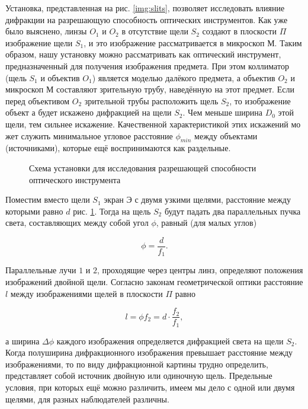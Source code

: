 Установка, представленная на рис. \ref{img:slits}, позволяет исследовать влияние
дифракции на разрешающую способность оптических инструментов.
Как уже было выяснено, линзы
$O_1$ и
$O_2$ в отсутствие щели
$S_2$ создают
в плоскости
$\Pi$ изображение щели
$S_1$, и это изображение рассматривается
в микроскоп $М$.
Таким образом, нашу
установку можно рассматривать
как оптический инструмент, предназначенный для получения изображения предмета. При этом
коллиматор (щель
$S_1$ и объектив
$O_1$) является
моделью далёкого предмета,
а объектив
$O_2$ и микроскоп
$М$ составляют
зрительную трубу, наведённую на этот предмет.
Если перед объективом
$O_2$ зрительной трубы расположить щель
$S_2$,
то изображение объект
а будет искажено дифракцией на щели
$S_2$. Чем
меньше ширина
$D_0$ этой щели, тем сильнее искажение. Качественной
характеристикой этих искажений мо
жет служить минимальное угловое
расстояние $\phi_{min}$ между объектами (источниками),
которые ещё воспринимаются
как раздельные.

\begin{figure}[h]
  \caption{Схема установки для исследования разрешающей способности оптического инструмента}
  \label{img:fraunres}
\end{figure}

Поместим вместо щели
$S_1$ экран
$Э$ с двумя узкими щелями, расстояние между
которыми равно
$d$ рис. \ref{img:fraunres}.
Тогда на щель
$S_2$ будут падать два параллельных пучка света, составляющих между собой угол
$\phi$, равный (для малых углов)

\begin{equation}
  \phi = \frac{d}{f_1}.
\end{equation}\label{eq:ray_angle}

Параллельные лучи $1$ и $2$, проходящие через центры линз, определяют 
положения изображений двойной щели. 
Согласно законам геометрической оптики расстояние $l$ между изображениями щелей в плоскости
$\Pi$ равно

\begin{equation}
  l = \phi f_2 = d \cdot \frac{f_2}{f_1},
\end{equation}\label{eq:fraun_dist}

а ширина
$\Delta \phi$ каждого изображения определяется дифракцией света на
щели $S_2$. Когда полуширина дифракционного изображения превышает
расстояние между изображениями, то по виду дифракционной
картины
трудно определить, представляет собой источник двойную или одиночную щель. Предельные
условия, при
которых ещё можно различить,
имеем мы дело с одной или двумя щелями, для разных наблюдателей
различны.


